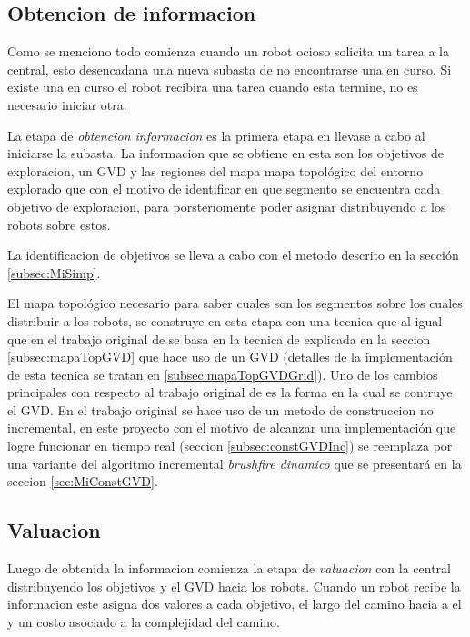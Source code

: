 \subsection{Obtencion de informacion}\label{subsec:obtInfo}
Como se menciono todo comienza cuando un robot ocioso solicita un tarea a la
central, esto desencadana una nueva subasta de no encontrarse una en curso. Si
existe una en curso el robot recibira una tarea cuando esta termine, no es
necesario iniciar otra.

La etapa de \emph{obtencion informacion} es la primera etapa en llevase a cabo
al iniciarse la subasta. La informacion que se obtiene en esta son los
objetivos de exploracion, un GVD y las regiones del mapa mapa topológico del
entorno explorado que con el motivo de identificar en que segmento se encuentra
cada objetivo de exploracion, para porsteriomente poder asignar distribuyendo a
los robots sobre estos. 

La identificacion de objetivos se lleva a cabo con el metodo descrito en la
sección \ref{subsec:MiSimp}.

El mapa topológico necesario para saber cuales son los segmentos sobre
los cuales distribuir a los robots, se construye en esta etapa con una
tecnica que al igual que en el trabajo original de
\cite{wurm2008coordinated} se basa en la tecnica de \cite{Thrun1998}
explicada en la seccion \ref{subsec:mapaTopGVD} que hace uso de 
un GVD (detalles de la implementación de esta tecnica se tratan en
\ref{subsec:mapaTopGVDGrid}). Uno de los cambios principales con
respecto al trabajo original de \cite{wurm2008coordinated} es la forma
en la cual se contruye el GVD. En el trabajo original se hace uso de un
metodo de construccion no incremental, en este proyecto con el motivo de
alcanzar una implementación que logre funcionar en tiempo real (seccion
\ref{subsec:constGVDInc}) se reemplaza por una variante del algoritmo
incremental \emph{brushfire dinamico} que se presentará en la seccion
\ref{sec:MiConstGVD}.


\subsection{Valuacion} \label{subsec:MiValSub}

Luego de obtenida la informacion comienza la etapa de \emph{valuacion}
con la central distribuyendo los objetivos y el GVD hacia los robots. Cuando un
robot recibe la informacion este asigna dos valores a cada objetivo, el largo
del camino hacia a el y un costo asociado a la complejidad del camino.

